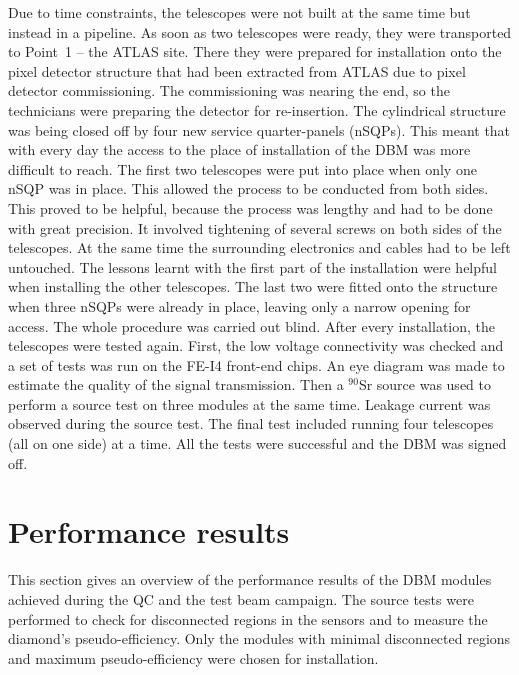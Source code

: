 \documentclass[12pt]{packages/mytustyle}  %
\begin{document}
Due to time constraints, the telescopes were not built at the same time but instead in a pipeline. As soon as two telescopes were ready, they were transported to Point~1 -- the ATLAS site. There they were prepared for installation onto the pixel detector structure that had been extracted from ATLAS due to pixel detector commissioning. The commissioning was nearing the end, so the technicians were preparing the detector for re-insertion. The cylindrical structure was being closed off by four new service quarter-panels (nSQPs). This meant that with every day the access to the place of installation of the DBM was more difficult to reach. The first two telescopes were put into place when only one nSQP was in place. This allowed the process to be conducted from both sides. This proved to be helpful, because the process was lengthy and had to be done with great precision. It involved tightening of several screws on both sides of the telescopes. At the same time the surrounding electronics and cables had to be left untouched. The lessons learnt with the first part of the installation were helpful when installing the other telescopes. The last two were fitted onto the structure when three nSQPs were already in place, leaving only a narrow opening for access. The whole procedure was carried out blind. After every installation, the telescopes were tested again. First, the low voltage connectivity was checked and a set of tests was run on the FE-I4 front-end chips. An eye diagram was made to estimate the quality of the signal transmission. Then a $^{90}$Sr source was used to perform a source test on three modules at the same time. Leakage current was observed during the source test. The final test included running four telescopes (all on one side) at a time. All the tests were successful and the DBM was signed off.


\section{Performance results}
\label{sec:perfresults}
This section gives an overview of the performance results of the DBM modules achieved during the QC and the test beam campaign. The source tests were performed to check for disconnected regions in the sensors and to measure the diamond's pseudo-efficiency. Only the modules with minimal disconnected regions and maximum pseudo-efficiency were chosen for installation. 
\end{document}
